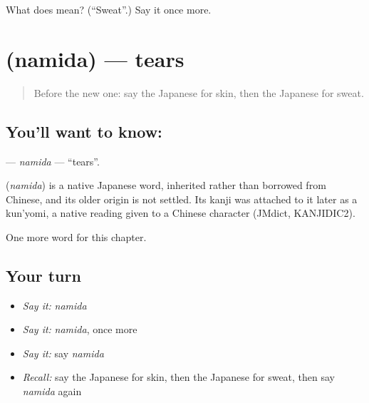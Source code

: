 \begin{tcolorbox}[breakable,colback=teal!4,colframe=teal!35!black,title={Before you move on}]
What does  mean? (\textquotedblleft{}Sweat\textquotedblright{}.) Say it once more.
\end{tcolorbox}
\section[\texorpdfstring{\ja{なみだ} (namida)}{なみだ (namida)}]{ (namida) — tears}

\label{lesson:JA-C22-namida}



\begin{quote}
Before the new one: say the Japanese for skin, then the Japanese for sweat.
\end{quote}

\subsection*{You'll want to know: }
\textbf{} — \emph{namida} — \textquotedblleft{}tears\textquotedblright{}.

\begin{cousinweb}
\textbf{} (\emph{namida}) is a native Japanese word, inherited rather than borrowed from Chinese, and its older origin is not settled. Its kanji was attached to it later as a kun'yomi, a native reading given to a Chinese character (JMdict, KANJIDIC2).
\end{cousinweb}

\begin{grammarlens}[title={What you've built}]
One more word for this chapter.
\end{grammarlens}

\subsection*{Your turn}
\begin{itemize}
\raggedright
  \item \emph{Say it:} \emph{namida}
  \item \emph{Say it:} \emph{namida}, once more
  \item \emph{Say it:} say \emph{namida}
  \item \emph{Recall:} say the Japanese for skin, then the Japanese for sweat, then say \emph{namida} again
\end{itemize}

